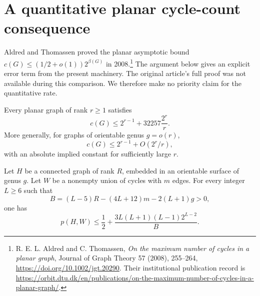 \section{A quantitative planar cycle-count consequence}
\label{sec:planar-cycle-error}

Aldred and Thomassen proved the planar asymptotic bound
$c(G)\le(1/2+o(1))2^{\beta(G)}$ in 2008.\footnote{R. E. L. Aldred and C. Thomassen,
\emph{On the maximum number of cycles in a planar graph}, Journal of Graph Theory 57 (2008), 255--264,
\url{https://doi.org/10.1002/jgt.20290}. Their institutional publication record is
\url{https://orbit.dtu.dk/en/publications/on-the-maximum-number-of-cycles-in-a-planar-graph/}.}
The argument below gives an explicit error term from the present machinery.
The original article's full proof was not available during this comparison.
We therefore make no priority claim for the quantitative rate.

\begin{proposition}\label{prop:planar-cycle-error}
Every planar graph of rank $r\ge1$ satisfies
\[
 c(G)\le2^{r-1}+32257\frac{2^r}{r}.
\]
More generally, for graphs of orientable genus $g=o(r)$,
\[
 c(G)\le2^{r-1}+O(2^r/r),
\]
with an absolute implied constant for sufficiently large $r$.
\end{proposition}

\begin{lemma}\label{lem:embedded-marked-forest}
Let $H$ be a connected graph of rank $R$, embedded in an orientable surface of genus $g$.
Let $W$ be a nonempty union of cycles with $m$ edges.
For every integer $L\ge6$ such that
\[
 B=(L-5)R-(4L+12)m-2(L+1)g>0,
\]
one has
\[
 p(H,W)\le\frac12+
 \frac{3L(L+1)(L-1)2^{L-2}}{B}.
\]
\end{lemma}

